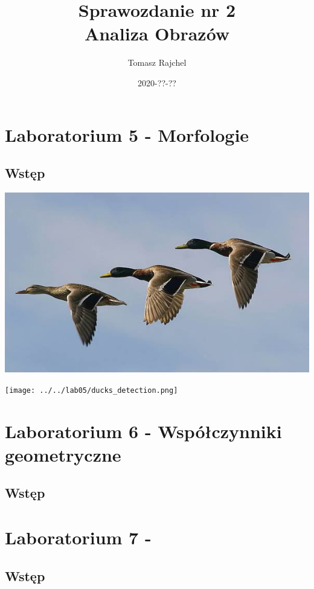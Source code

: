 \documentclass{article}
\title{Sprawozdanie nr 2\\Analiza Obrazów}
\date{2020-??-??}
\author{Tomasz Rajchel}
\begin{document}
	\maketitle

	\tableofcontents
	\newpage
	
	\section{Laboratorium 5 - Morfologie}
	\subsection{Wstęp}
		\begin{center}
		\includegraphics[width=\linewidth]{../../pictures/kaczki.jpg}
	\end{center}

	\begin{center}
		\texttt{[image: ../../lab05/ducks\_detection.png]}
		\label{fig:cat_gray}
	\end{center}
	
	\section{Laboratorium 6 - Współczynniki geometryczne}
	\subsection{Wstęp}
	
	\section{Laboratorium 7 - }
	\subsection{Wstęp}
	
\end{document}
